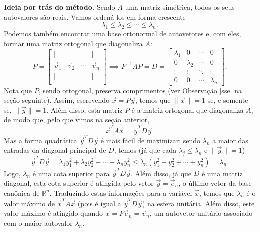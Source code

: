 \noindent \textbf{Ideia por trás do método.} Sendo $A$ uma matriz simétrica, todos os seus autovalores são reais. Vamos ordená-los em forma crescente
\begin{equation}
\lambda_1 \le \lambda_2 \le \cdots \le \lambda_n.
\end{equation} Podemos também encontrar uma base ortonormal de autovetores e, com eles, formar uma matriz ortogonal que diagonaliza $A$:
\begin{equation}
P =
\begin{bmatrix}
| & | &  & | \\
\vec{v}_1 & \vec{v}_2 & \cdots & \vec{v}_n \\
| & | &  & | \\
\end{bmatrix} \implies
P^{-1} A P = D =
\begin{bmatrix}
\lambda_1 & 0  & \cdots & 0 \\
0 & \lambda_2  & \cdots & 0 \\
\vdots & \vdots & \ddots & \vdots \\
0 & 0 & \cdots & \lambda_n
\end{bmatrix}.
\end{equation} Nota que $P$, sendo ortogonal, preserva comprimentos (ver Observação \ref{sse} na seção seguinte). Assim, escrevendo $\vec{x} = P \vec{y}$, temos que $\|\vec{x}\| = 1$ se, e somente se, $\|\vec{y}\| = 1$. Além disso, esta matriz $P$ é a matriz ortogonal que diagonaliza $A$, de modo que, pelo que vimos na seção anterior,
\begin{equation}
\vec{x}^T A \vec{x} = \vec{y}^T D \vec{y}.
\end{equation} Mas a forma quadrática $\vec{y}^T D \vec{y}$ é mais fácil de maximizar: sendo $\lambda_n$ a maior das entradas da diagonal principal de $D$, temos (já que cada $\lambda_j \le \lambda_n$ e $\|\vec{y}\| = 1$)
\begin{equation}
\vec{y}^T D \vec{y} = \lambda_1 y_1^2 + \lambda_2 y_2^2 + \cdots + \lambda_n y_n^2 \le  \lambda_n (y_1^2 +y_2^2 + \cdots + y_n^2) = \lambda_n.
\end{equation} Logo, $\lambda_n$ é uma cota superior para $\vec{y}^T D \vec{y}$. Além disso, já que $D$ é uma matriz diagonal, esta cota superior é atingida pelo vetor $\vec{y} = \vec{e}_n$, o último vetor da base canônica de $\mathbb{R}^n$. Traduzindo estas informações para a variável $\vec{x}$, temos que $\lambda_n$ é o valor máximo de $\vec{x}^T A \vec{x}$ (pois é igual a $\vec{y}^T D \vec{y}$) na esfera unitária. Além disso, este valor máximo é atingido quando $\vec{x} = P \vec{e}_n = \vec{v}_n$, um autovetor unitário associado com o maior autovalor $\lambda_n$.

